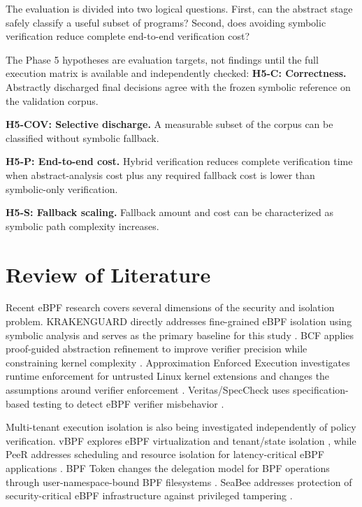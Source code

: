\documentclass[12pt,a4paper]{article}
\begin{document}
The evaluation is divided into two logical questions. First, can the abstract stage safely classify a useful subset of programs? Second, does avoiding symbolic verification reduce complete end-to-end verification cost?

The Phase 5 hypotheses are evaluation targets, not findings until the full execution matrix is available and independently checked:
\noindent \textbf{H5-C: Correctness.} Abstractly discharged final decisions agree with the frozen symbolic reference on the validation corpus.

\noindent \textbf{H5-COV: Selective discharge.} A measurable subset of the corpus can be classified without symbolic fallback.

\noindent \textbf{H5-P: End-to-end cost.} Hybrid verification reduces complete verification time when abstract-analysis cost plus any required fallback cost is lower than symbolic-only verification.

\noindent \textbf{H5-S: Fallback scaling.} Fallback amount and cost can be characterized as symbolic path complexity increases.


\section{Review of Literature}

Recent eBPF research covers several dimensions of the security and isolation problem. KRAKENGUARD directly addresses fine-grained eBPF isolation using symbolic analysis and serves as the primary baseline for this study \citep{patel2026krakenguard}. BCF applies proof-guided abstraction refinement to improve verifier precision while constraining kernel complexity \citep{sun2025bcf}. Approximation Enforced Execution investigates runtime enforcement for untrusted Linux kernel extensions and changes the assumptions around verifier enforcement \citep{sun2025aee}. Veritas/SpecCheck uses specification-based testing to detect eBPF verifier misbehavior \citep{lyu2025veritas}.

Multi-tenant execution isolation is also being investigated independently of policy verification. vBPF explores eBPF virtualization and tenant/state isolation \citep{zhang2026vbpf}, while PeeR addresses scheduling and resource isolation for latency-critical eBPF applications \citep{carin2026peer}. BPF Token changes the delegation model for BPF operations through user-namespace-bound BPF filesystems \citep{bpftoken}. SeaBee addresses protection of security-critical eBPF infrastructure against privileged tampering \citep{seabee}.
\end{document}
